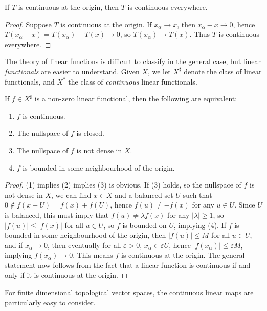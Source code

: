 \begin{lemma}
    If $T$ is continuous at the origin, then $T$ is continuous everywhere.
\end{lemma}
\begin{proof}
    Suppose $T$ is continuous at the origin. If $x_\alpha \to x$, then $x_\alpha - x \to 0$, hence $T(x_\alpha - x) = T(x_\alpha) - T(x) \to 0$, so $T(x_\alpha) \to T(x)$. Thus $T$ is continuous everywhere.
\end{proof}

The theory of linear functions is difficult to classify in the general case, but linear {\it functionals} are easier to understand. Given $X$, we let $X^\sharp$ denote the class of linear functionals, and $X^*$ the class of {\it continuous} linear functionals.

\begin{theorem}
    If $f \in X^\sharp$ is a non-zero linear functional, then the following are equivalent:
    \begin{enumerate}
        \item $f$ is continuous.
        \item The nullspace of $f$ is closed.
        \item The nullspace of $f$ is not dense in $X$.
        \item $f$ is bounded in some neighbourhood of the origin.
    \end{enumerate}
\end{theorem}
\begin{proof}
    (1) implies (2) implies (3) is obvious. If (3) holds, so the nullspace of $f$ is not dense in $X$, we can find $x \in X$ and a balanced set $U$ such that $0 \not \in f(x + U) = f(x) + f(U)$, hence $f(u) \neq - f(x)$ for any $u \in U$. Since $U$ is balanced, this must imply that $f(u) \neq \lambda f(x)$ for any $|\lambda| \geq 1$, so $|f(u)| \leq |f(x)|$ for all $u \in U$, so $f$ is bounded on $U$, implying (4). If $f$ is bounded in some neighbourhood of the origin, then $|f(u)| \leq M$ for all $u \in U$, and if $x_\alpha \to 0$, then eventually for all $\varepsilon > 0$, $x_\alpha \in \varepsilon U$, hence $|f(x_\alpha)| \leq \varepsilon M$, implying $f(x_\alpha) \to 0$. This means $f$ is continuous at the origin. The general statement now follows from the fact that a linear function is continuous if and only if it is continuous at the origin.
\end{proof}

For finite dimensional topological vector spaces, the continuous linear maps are particularly easy to consider.

